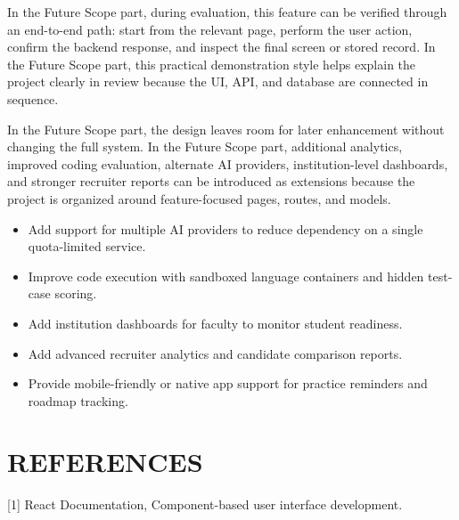 \documentclass[12pt,a4paper]{report}
\begin{document}
In the Future Scope part, during evaluation, this feature can be verified through an end-to-end path: start from the relevant page, perform the user action, confirm the backend response, and inspect the final screen or stored record. In the Future Scope part, this practical demonstration style helps explain the project clearly in review because the UI, API, and database are connected in sequence.


In the Future Scope part, the design leaves room for later enhancement without changing the full system. In the Future Scope part, additional analytics, improved coding evaluation, alternate AI providers, institution-level dashboards, and stronger recruiter reports can be introduced as extensions because the project is organized around feature-focused pages, routes, and models.


\begin{itemize}
\item Add support for multiple AI providers to reduce dependency on a single quota-limited service.
\end{itemize}

\begin{itemize}
\item Improve code execution with sandboxed language containers and hidden test-case scoring.
\end{itemize}

\begin{itemize}
\item Add institution dashboards for faculty to monitor student readiness.
\end{itemize}

\begin{itemize}
\item Add advanced recruiter analytics and candidate comparison reports.
\end{itemize}

\begin{itemize}
\item Provide mobile-friendly or native app support for practice reminders and roadmap tracking.
\end{itemize}

\chapter*{REFERENCES}

[1] React Documentation, Component-based user interface development.
\end{document}
